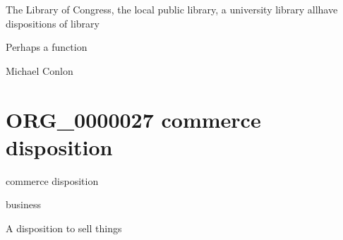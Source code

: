 \documentclass[letterpaper,10pt,english]{sphinxmanual}
\begin{document}
\begin{sphinxShadowBox}

\sphinxAtStartPar
The Library of Congress, the local public library, a university library allhave dispositions of library
\end{sphinxShadowBox}

\begin{sphinxShadowBox}

\sphinxAtStartPar
Perhaps a function
\end{sphinxShadowBox}

\begin{sphinxShadowBox}

\sphinxAtStartPar
Michael Conlon 
\end{sphinxShadowBox}
\begin{quote}
\label{\detokenize{doc-ORG_0000027:org-0000027}}\label{\detokenize{doc-ORG_0000027:commerce-disposition}}\label{\detokenize{doc-ORG_0000027:org-0000027}}
\ignorespaces \end{quote}


\section{ORG\_0000027 \sphinxhyphen{} commerce disposition}
\label{\detokenize{doc-ORG_0000027:org-0000027-commerce-disposition}}\label{\detokenize{doc-ORG_0000027:index-0}}\label{\detokenize{doc-ORG_0000027::doc}}
\begin{sphinxShadowBox}

\sphinxAtStartPar
commerce disposition
\end{sphinxShadowBox}

\begin{sphinxShadowBox}

\sphinxAtStartPar
business
\end{sphinxShadowBox}

\begin{sphinxShadowBox}

\sphinxAtStartPar
A disposition to sell things
\end{sphinxShadowBox}
\end{document}
